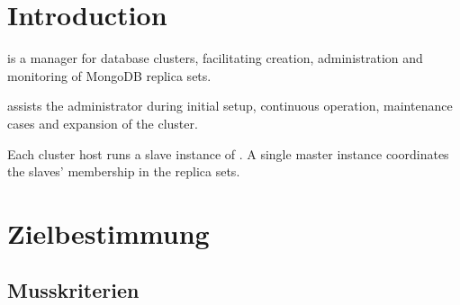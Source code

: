 \documentclass[a4paper, 11pt]{article}
\begin{document}
\section{Introduction}
\mamid is a manager for database \glspl{cluster}, facilitating creation, administration and monitoring of \gls{MongoDB} \glspl{replica set}.

\mamid assists the \gls{administrator} during initial setup, continuous operation, maintenance cases and expansion of the cluster.

Each cluster \gls{host} runs a \gls{slave} instance of \mamid.
A single \gls{master} instance coordinates the \glspl{slave}' membership in the \glspl{replica set}.

\section{Zielbestimmung}
\subsection{Musskriterien}
\end{document}
